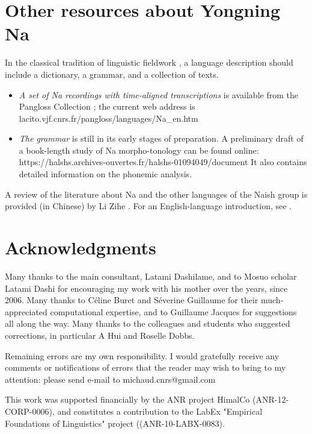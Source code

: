 	\section{Other resources about Yongning Na} \label{sec:resources}
	
	In the classical tradition of linguistic fieldwork \citep{Dixon2007}, a language description should include a dictionary, a grammar, and a collection of texts. 
	
	\begin{itemize}
		\item \textit{A set of Na recordings with time-aligned transcriptions} is available from the Pangloss Collection \citep{Michailovsky2014}; the current web address is lacito.vjf.cnrs.fr/pangloss/languages/Na\_en.htm 
		\item \textit{The grammar} is still in its early stages of preparation. A preliminary draft of a book-length study of Na morpho-tonology can be found online: https://halshs.archives-ouvertes.fr/halshs-01094049/document It also contains detailed information on the phonemic analysis.
	\end{itemize}
	
A review of the literature about Na and the other languages of the Naish  group is provided (in Chinese) by Li Zihe \citet{李子鹤2015}. For an English-language introduction, see \citet{Michaud2015b}.


	\section{Acknowledgments} \label{sec:ackno}

Many thanks to the main consultant, Latami Dashilame, and to Mosuo scholar Latami Dashi for encouraging my work with his mother over the years, since 2006. Many thanks to Céline Buret and Séverine Guillaume for their much-appreciated computational expertise, and to Guillaume Jacques for suggestions all along the way. Many thanks to the colleagues and students who suggested corrections, in particular A Hui and Roselle Dobbs.

Remaining errors are my own responsibility. I would gratefully receive any comments or notifications of errors that the reader may wish to bring to my attention: please send e-mail to michaud.cnrs@gmail.com 

This work was supported financially by the ANR project HimalCo (ANR-12-CORP-0006), and constitutes a contribution to the LabEx "Empirical Foundations of Linguistics" project ((ANR-10-LABX-0083).

